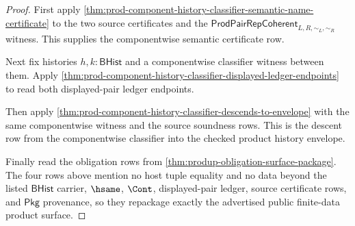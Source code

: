 \begin{proof}
First apply
\autoref{thm:prod-component-history-classifier-semantic-name-certificate} to
the two source certificates and the
$\mathsf{ProdPairRepCoherent}_{L,R,\sim_L,\sim_R}$ witness. This supplies the
componentwise semantic certificate row.

Next fix histories $h,k:\mathsf{BHist}$ and a componentwise classifier
witness between them. Apply
\autoref{thm:prod-component-history-classifier-displayed-ledger-endpoints} to
read both displayed-pair ledger endpoints.

Then apply
\autoref{thm:prod-component-history-classifier-descends-to-envelope} with the
same componentwise witness and the source soundness rows. This is the descent
row from the componentwise classifier into the checked product history
envelope.

Finally read the obligation rows from
\autoref{thm:produp-obligation-surface-package}. The four rows above mention
no host tuple equality and no data beyond the listed $\mathsf{BHist}$ carrier,
$\hsame$, $\Cont$, displayed-pair ledger, source certificate rows, and
$\mathsf{Pkg}$ provenance, so they repackage exactly the advertised public
finite-data product surface.
\end{proof}

